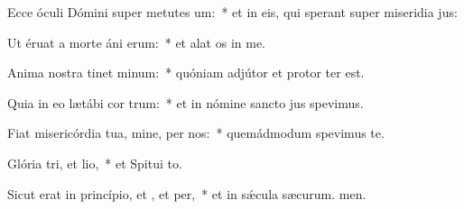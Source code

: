 \item Ecce óculi Dómini super metutes um:~* et in eis, qui sperant super miseridia jus:
\item Ut éruat a morte áni erum:~* et alat os in me.
\item Anima nostra tinet minum:~* quóniam adjútor et protor ter est.
\item Quia in eo lætábi cor trum:~* et in nómine sancto jus spevimus.
\item Fiat misericórdia tua, mine, per nos:~* quemádmodum spevimus  te.
\item Glória tri, et lio,~* et Spitui to.
\item Sicut erat in princípio, et , et per,~* et in sǽcula sæcurum. men.
